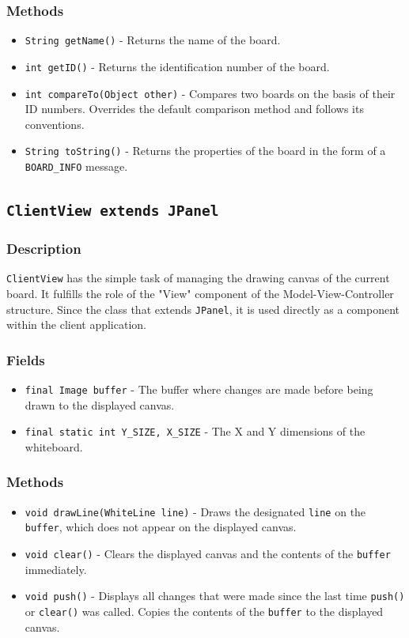 \subsubsection{Methods}
\begin{itemize}
\item \texttt{String getName()} - Returns the name of the board.
\item \texttt{int getID()} - Returns the identification number of the board.
\item \texttt{int compareTo(Object other)} - Compares two boards on the basis of their ID numbers. Overrides the default comparison method and follows its conventions.
\item \texttt{String toString()} - Returns the properties of the board in the form of a \texttt{BOARD\_INFO} message.
\end{itemize}


\subsection{\texttt{ClientView extends JPanel}}

\subsubsection{Description}
\texttt{ClientView} has the simple task of managing the drawing canvas of the current board. It fulfills the role of the "View" component of the Model-View-Controller structure. Since the class that extends \texttt{JPanel}, it is used directly as a component within the client application.

\subsubsection{Fields}
\begin{itemize}
\item \texttt{final Image buffer} - The buffer where changes are made before being drawn to the displayed canvas.
\item \texttt{final static int Y\_SIZE, X\_SIZE} - The X and Y dimensions of the whiteboard.
\end{itemize}

\subsubsection{Methods}
\begin{itemize}
\item \texttt{void drawLine(WhiteLine line)} - Draws the designated \texttt{line} on the \texttt{buffer}, which does not appear on the displayed canvas.
\item \texttt{void clear()} - Clears the displayed canvas and the contents of the \texttt{buffer} immediately.
\item \texttt{void push()} - Displays all changes that were made since the last time \texttt{push()} or \texttt{clear()} was called. Copies the contents of the \texttt{buffer} to the displayed canvas.
\end{itemize}